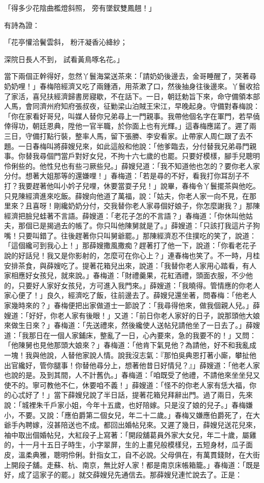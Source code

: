 \begin{showcontents}{}
「得多少花陰曲檻燈斜照，  旁有墜釵雙鳳翹！」

有詩為證：

「花亭懽洽鬢雲斜，  粉汗凝香沁絳紗；

深院日長人不到，  試看黃鳥啄名花。」

當下兩個正幹得好，忽然丫鬟海棠送茶來：「請奶奶後邊去，金哥睡醒了，哭著尋奶奶哩！」春梅陪經濟又吃了兩鍾酒，用茶漱了口，然後抽身往後邊來。丫鬟收拾了家活，喜兒扶經濟歸書房寢歇，不在話下。一日，朝廷勅旨下來，命守備領本部人馬，會同濟州府知府張叔夜，征勦梁山泊賊王宋江，早晚起身。守備對春梅說：「你在家看好哥兒，叫媒人替你兄弟尋上一門親事。我帶他個名字在軍門，若早僥倖得功，朝廷恩典，陞他一官半職，於你面上也有光輝。」這春梅應諾了。遲了兩三日，守備打點行裝，整率人馬，留下張勝、李安看家。止帶家人周仁跟了去不題。一日春梅叫將薛嫂兒來，如此這般和他說：「他爹臨去，分付替我兄弟尋門親事。你替我尋個門當戶對好女兒，不拘十六七歲的也罷。只要好模樣，腳手兒聰明伶俐些的。他性兒也有些刁厥些兒。」薛嫂兒道：「我不知道他也怎的？要你老人家分付。想著大姐那等的還嫌哩！」春梅道：「若是尋的不好，看我打你耳刮子不打？我要趕著他叫小妗子兒哩，休要當耍子兒！」說畢，春梅令丫鬟擺茶與他吃。只見陳經濟進來吃飯。薛嫂向他道了萬福，說：「姑夫，你老人家一向不見，在那里來？且喜呀！剛纔奶奶分付，交我替你老人家尋個好娘子，你怎麼謝我？」那陳經濟把臉兒蛙著不言語。薛嫂道：「老花子怎的不言語？」春梅道：「你休叫他姑夫，那個已是揭過去的帳了。你只叫他陳舅就是了。」薛嫂道：「只該打我這片子狗嘴！只要叫錯了。往後趕著你只叫舅爺罷。」那陳經濟忍不住撲吃的笑了，說道：「這個纔可到我心上！」那薛嫂撒風撒痴？趕著打了他一下，說道：「你看老花子說的好話兒！我又是你影射的，怎麼可在你心上？」連春梅也笑了。不一時，月桂安排茶食，與薛嫂吃了。提著花箱兒出來，說道：「我替你老人家用心踏看，有人家相應好女孩兒，就來說。」春梅道：「財禮羹果，花紅酒禮，頭面衣服，不少他的，只要好人家好女孩兒，方可進入我門來。」薛嫂道：「我曉得。管情應的你老人家心便了！」良久，經濟吃了飯，往前邊去了。薛嫂兒還坐著，問春梅：「他老人家幾時來的？」春梅便把出家做道士一節說了：「我尋得他來，做我個親人兒。」薛嫂道：「好好，你老人家有後眼！」又道：「前日你老人家好的日子，說那頭他大娘來做生日來？」春梅道：「先送禮來，然後纔使人送帖兒請他坐了一日去了。」薛嫂道：「我那日在一個人家鋪床，整亂了一日，心內要來，急的我要不的！」又問：「他陳舅也見他那頭大娘來？」春梅道：「他肯下氣見他？為請他，好不和我亂成一塊！我與他說，人替他家說人情。說我沒志氣：『那怕吳典恩打著小廝，攀扯他出官纔好，管你腿事！你替他尋分上，想著他昔日好情兒？』」薛嫂道：「他老人家也說的是。及到其間，人不計舊仇。」春梅道：「咱既受了他禮，不請他來坐坐兒又使不的。寧可教他不仁，休要咱不義！」薛嫂道：「怪不的你老人家有恁大福，你的心忒好了！」當下薛嫂兒說了半日話，提著花箱兒拜辭出門。過了兩日，先來說：「城裡朱千戶家小姐，今年十五歲，也好陪嫁。只是沒了娘的兒子。」春梅嫌小，不要。又說：「應伯爵第二個女兒，年二十二歲。」春梅又嫌應伯爵死了，在大爺手內聘嫁，沒甚陪送也不成。都回出婚帖兒來。又遲了幾日，薛嫂兒送花兒來，袖中取出個婚帖兒，大紅段子上寫著：「開段舖葛員外家大女兒，年二十歲，屬雞的，十一月十五日子時生，小字翠屏，生的上畫兒般模樣兒，五短身材，瓜子面皮，溫柔典雅，聰明伶俐。針指女工，自不必說。父母俱在，有萬貫錢財，在大街上開段子舖。走蘇、杭、南京，無比好人家！都是南京床帳箱籠。」春梅道：「既是好，成了這家子的罷。」就交薛嫂兒先通信去。那薛嫂兒連忙說去了。正是：


\end{showcontents}
